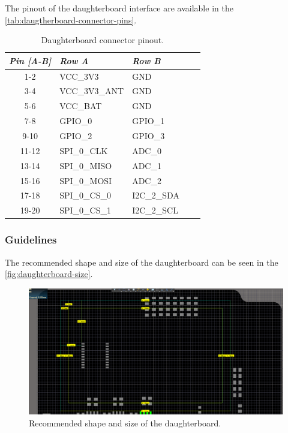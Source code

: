 The pinout of the daughterboard interface are available in the \autoref{tab:daugtherboard-connector-pins}.

\begin{table}[!h]
    \centering
    \begin{tabular}{cllll}
        \toprule[1.5pt]
        \textit{Pin [A-B]} & \textit{Row A} & \textit{Row B} \\
        \midrule
        1-2                & VCC\_3V3       & GND            \\
        3-4                & VCC\_3V3\_ANT  & GND            \\
        5-6                & VCC\_BAT       & GND            \\
        7-8                & GPIO\_0        & GPIO\_1        \\
        9-10               & GPIO\_2        & GPIO\_3        \\
        11-12              & SPI\_0\_CLK    & ADC\_0         \\
        13-14              & SPI\_0\_MISO   & ADC\_1         \\
        15-16              & SPI\_0\_MOSI   & ADC\_2         \\
        17-18              & SPI\_0\_CS\_0  & I2C\_2\_SDA    \\
        19-20              & SPI\_0\_CS\_1  & I2C\_2\_SCL    \\
        \bottomrule[1.5pt]
    \end{tabular}
    \caption{Daughterboard connector pinout.}
    \label{tab:daugtherboard-connector-pins}
\end{table}

\subsubsection{Guidelines}

The recommended shape and size of the daughterboard can be seen in the \autoref{fig:daughterboard-size}.

\begin{figure}[!ht]
    \begin{center}
        \includegraphics[width=\textwidth]{figures/daughterboard_size.png}
        \caption{Recommended shape and size of the daughterboard.}
        \label{fig:daughterboard-size}
    \end{center}
\end{figure}

